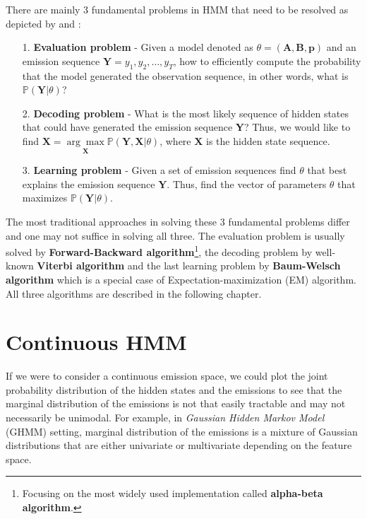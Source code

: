 There are mainly 3 fundamental problems in HMM that need to be resolved as depicted by \citep{Oliver2013} and \citep{Ching2005}:
\begin{itemize}
\item[1.] \textbf{Evaluation problem} - Given a model denoted as $\theta = (\textbf{A},\textbf{B},\textbf{p})$ and an emission sequence 
                                        $\textbf{Y} = y_1, y_2,\ldots,y_T$, how to efficiently compute the probability that the model generated the observation 
                                        sequence, in other words, what is $\mathbb{P}(\textbf{Y}|\theta)$? 
\item[2.] \textbf{Decoding problem} - What is the most likely sequence of hidden states that could have generated the emission sequence \textbf{Y}? 
                                      Thus, we would like to find $\textbf{X} = \underset{\textbf{X}}{\arg\max} \mathbb{P}(\textbf{Y},\textbf{X}|\theta)$, 
                                      where $\textbf{X}$ is the hidden state sequence. 
\item[3.] \textbf{Learning problem} - Given a set of emission sequences find $\theta$ that best explains the emission sequence $\textbf{Y}$. 
                                      Thus, find the vector of parameters $\theta$ that maximizes $\mathbb{P}(\textbf{Y}|\theta)$. 
\end{itemize}

The most traditional approaches in solving these 3 fundamental problems differ and one may not suffice in solving all three. 
The evaluation problem is usually solved by \textbf{Forward-Backward algorithm}\footnote{Focusing on the most widely used implementation called \textbf{alpha-beta algorithm}.}, the decoding problem by well-known \textbf{Viterbi algorithm} 
and the last learning problem by \textbf{Baum-Welsch algorithm} which is a special case of Expectation-maximization (EM) algorithm.
 All three algorithms are described in the following chapter.
 
\section{Continuous HMM}
 
If we were to consider a continuous emission space, we could plot the joint probability distribution of the hidden states and the emissions to see that 
the marginal distribution of the emissions is not that easily tractable and may not necessarily be unimodal. For example, in \textit{Gaussian Hidden Markov Model} (GHMM) setting, 
marginal distribution of the emissions is a mixture of Gaussian distributions that are either univariate or multivariate depending on the feature space. \citep{Bishop2006}


